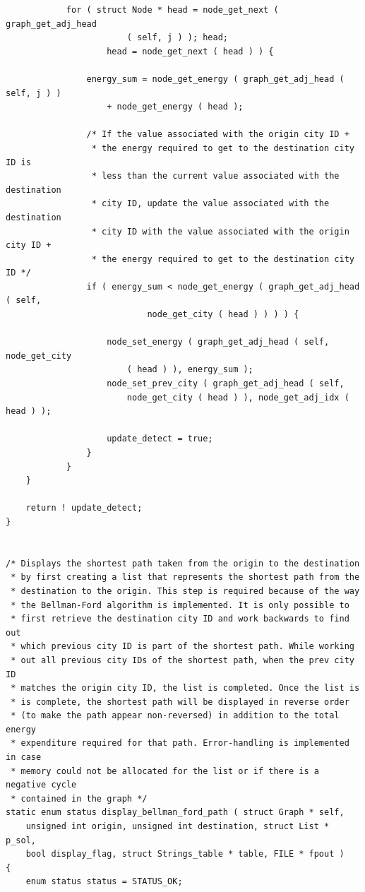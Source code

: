 \documentclass[11pt]{article}
\begin{document}
\begin{verbatim}
            for ( struct Node * head = node_get_next ( graph_get_adj_head
                        ( self, j ) ); head;
                    head = node_get_next ( head ) ) {

                energy_sum = node_get_energy ( graph_get_adj_head ( self, j ) )
                    + node_get_energy ( head );

                /* If the value associated with the origin city ID +
                 * the energy required to get to the destination city ID is
                 * less than the current value associated with the destination
                 * city ID, update the value associated with the destination
                 * city ID with the value associated with the origin city ID +
                 * the energy required to get to the destination city ID */
                if ( energy_sum < node_get_energy ( graph_get_adj_head ( self,
                            node_get_city ( head ) ) ) ) {

                    node_set_energy ( graph_get_adj_head ( self, node_get_city
                        ( head ) ), energy_sum );
                    node_set_prev_city ( graph_get_adj_head ( self,
                        node_get_city ( head ) ), node_get_adj_idx ( head ) );

                    update_detect = true;
                }
            }
    }

    return ! update_detect;
}


/* Displays the shortest path taken from the origin to the destination
 * by first creating a list that represents the shortest path from the
 * destination to the origin. This step is required because of the way
 * the Bellman-Ford algorithm is implemented. It is only possible to
 * first retrieve the destination city ID and work backwards to find out
 * which previous city ID is part of the shortest path. While working
 * out all previous city IDs of the shortest path, when the prev city ID
 * matches the origin city ID, the list is completed. Once the list is
 * is complete, the shortest path will be displayed in reverse order
 * (to make the path appear non-reversed) in addition to the total energy
 * expenditure required for that path. Error-handling is implemented in case
 * memory could not be allocated for the list or if there is a negative cycle
 * contained in the graph */
static enum status display_bellman_ford_path ( struct Graph * self,
    unsigned int origin, unsigned int destination, struct List * p_sol,
    bool display_flag, struct Strings_table * table, FILE * fpout )
{
    enum status status = STATUS_OK;


\end{verbatim}
\end{document}
